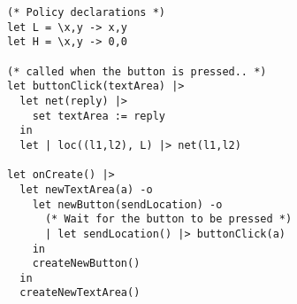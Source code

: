 \begin{figure*}
\begin{verbatim}
(* Policy declarations *)
let L = \x,y -> x,y
let H = \x,y -> 0,0

(* called when the button is pressed.. *)
let buttonClick(textArea) |>
  let net(reply) |>
    set textArea := reply
  in
  let | loc((l1,l2), L) |> net(l1,l2)

let onCreate() |>
  let newTextArea(a) -o
    let newButton(sendLocation) -o
      (* Wait for the button to be pressed *)
      | let sendLocation() |> buttonClick(a)
    in
    createNewButton()
  in
  createNewTextArea()
\end{verbatim}
\end{figure*}
